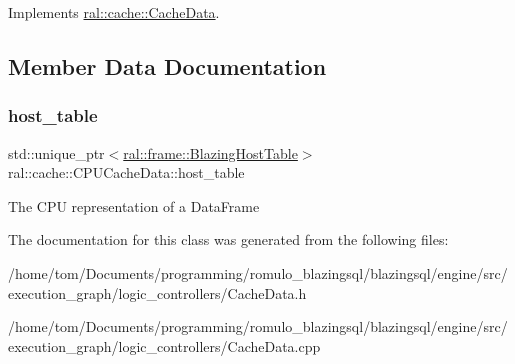 Implements \hyperlink{classral_1_1cache_1_1CacheData_aaad8a726296574845f01f9380dcee40d}{ral\+::cache\+::\+Cache\+Data}.



\subsection{Member Data Documentation}
\mbox{\label{classral_1_1cache_1_1CPUCacheData_ae46ccefa906792a3b31bbd94e7fdcef1}} 
\subsubsection{\texorpdfstring{host\+\_\+table}{host\_table}}
{\footnotesize\ttfamily std\+::unique\+\_\+ptr$<$\hyperlink{classral_1_1frame_1_1BlazingHostTable}{ral\+::frame\+::\+Blazing\+Host\+Table}$>$ ral\+::cache\+::\+C\+P\+U\+Cache\+Data\+::host\+\_\+table\hspace{0.3cm}{\ttfamily [protected]}}

The C\+PU representation of a Data\+Frame 

The documentation for this class was generated from the following files\+:\begin{DoxyCompactItemize}
\item 
/home/tom/\+Documents/programming/romulo\+\_\+blazingsql/blazingsql/engine/src/execution\+\_\+graph/logic\+\_\+controllers/Cache\+Data.\+h\item 
/home/tom/\+Documents/programming/romulo\+\_\+blazingsql/blazingsql/engine/src/execution\+\_\+graph/logic\+\_\+controllers/Cache\+Data.\+cpp\end{DoxyCompactItemize}

